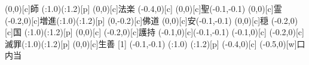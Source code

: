 \documentclass[m_shidai]{subfiles}
\begin{document}
{
\karifu(0,0)[c]{師}{\iro{\c}\sho\tsuya{\q}}
{\tsuya{\q}%
\ooyu{\q}\kili[se]\base(\s:1.0)\modori*(\w:1.2)[p]\orisute\iro{\k}\sho\iro[2]{\k}\sho}%
\karifu(0,0)[c]{法楽}
{\uchitsuke{\q}\tsuya{\q}
\aki\tsuya{\q}}
\newline
\karifu(-0.4,0)[c]{}
{\lwoo\aki{\q}\tsuya{\q}\sho}
\karifu(0,0)[c]{聖}{\qyu\moveTo(-0.1,-0.1)\iro{\c}\sho{}}
\karifu(0,0)[c]{霊}{\iro{\c}\sho\tsuya{\q}}
\karifu(-0.2,0)[c]{増進}{\lwoo\tsuya{\q}\ooyu{\q}\kili[e]\base(\s:1.0)\modori*(\w:1.2)[p]\orisute\iro{\k}\sho\iro[2]{\k}\sho}
\karifu(0,-0.2)[c]{佛道}{\sho\tsuya{\q}\tsu{}\aki\tsuya{\q}}
\newline
{\lwoo\aki{\q}\tsuya{\q}\sho}
\karifu(0,0)[c]{安}{\qyu\moveTo(-0.1,-0.1)\iro{\c}\sho{}}
\karifu(0,0)[c]{穏}{\iro{\c}\sho\tsuya{\q}}
\karifu(-0.2,0)[c]{国}
{\lwoo\tsu\aki{\q}
\ooyu{\q}\kili[e]\base(\s:1.0)\modori*(\w:1.2)[p]\orisute\iro{\k}\sho\iro[2]{\k}\sho}
\karifu(0,0)[c]
{\hspace{-0.2zw}}
{\sho\tsuya{\q}\aki\tsuya{\q}}
\newline
\karifu(-0.2,0)[c]{護持}
{\lwoo\aki{\q}\tsuya{\q}\sho}
\karifu(-0.1,0)[c]{}{\qyu\moveTo(-0.1,-0.1)\iro{\c}\sho}
\karifu(-0.1,0)[c]{}{\iro{\c}\sho\tsuya{\q}}
\karifu(-0.2,0)[c]{滅罪}{\lwoo\tsuya{\q}\ooyu{\q}\kili[e]\base(\s:1.0)\modori*(\w:1.2)[p]\orisute\iro{\k}\sho\iro[2]{\k}\sho}
\karifu(0,0)[c]{生善}{\sho\tsuya{\q}\aki\tsuya{\q}}
\newline
{[1]{\lw}\aki{\q}\qyu{}}
{\qyu\moveTo(-0.1,-0.1)\iro{\c}\sho{}%
\iro{\c}\sho\tsuya{\q}}
{\lwoo{}\tsuya{\q}%
\aki{}\ooyu{\q}\kili[e]\base(\s:1.0)%
\modori*(\w:1.2)[p]\orisute\iro{\k}\sho\iro[2]{\k}\sho}
{\sho\tsuya{\q}\tsu{}\aki\tsuya{\q}}
\newline
\karifu(-0.4,0)[c]{}
{\lwoo\tsuya{\q}\aki%
\qyu\moji(-0.5,0)[w]{口内当}%
}}
\end{document}
